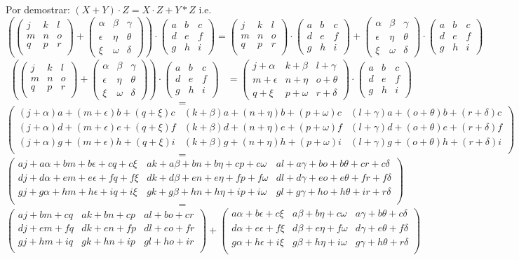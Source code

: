 \documentclass[letterpaper]{article}
\newcommand{\Nmat}{\begin{pmatrix}
		j & k & l\\
		m & n & o\\
		q & p & r\\
\end{pmatrix}}
\newcommand{\Pmat}{\begin{pmatrix}
		\alpha & \beta & \gamma\\
		\epsilon & \eta & \theta\\
		\xi & \omega & \delta
\end{pmatrix}}
\newcommand{\Mmat}{\begin{pmatrix}
		a & b & c\\
		d & e & f\\
		g & h & i
\end{pmatrix}}
\renewcommand{\*}{\cdot}
\theoremstyle{definition}
\begin{document}
Por demostrar: $ (X + Y) \* Z = X\*Z + Y*Z $ i.e. $ \left( \Nmat + \Pmat \right) \* \Mmat = \Nmat \* \Mmat + \Pmat \* \Mmat  $
\begin{align*}
\left( \Nmat + \Pmat \right) \* \Mmat &= \begin{pmatrix}
j + \alpha & k + \beta & l + \gamma\\
m + \epsilon & n + \eta & o + \theta\\
q + \xi & p + \omega & r + \delta
\end{pmatrix}  \* \Mmat
\end{align*}
$$ =$$
$$
\begin{pmatrix}
(j + \alpha)a + (m + \epsilon)b + (q + \xi)c & (k + \beta)a + (n + \eta)b + (p + \omega)c & (l + \gamma)a + (o + \theta)b + (r + \delta)c\\
(j + \alpha)d + (m + \epsilon)e + (q + \xi)f & (k + \beta)d + (n + \eta)e + (p + \omega)f & (l + \gamma)d + (o + \theta)e + (r + \delta)f\\
(j + \alpha)g + (m + \epsilon)h + (q + \xi)i & (k + \beta)g + (n + \eta)h + (p + \omega)i & (l + \gamma)g + (o + \theta)h + (r + \delta)i\\
\end{pmatrix}
$$
$$ =$$
$$ 
\begin{pmatrix}
aj + a\alpha + bm + b\epsilon + cq + c\xi & ak + a\beta + bn + b\eta + cp + c\omega & al + a\gamma + bo + b\theta + cr + c\delta\\
dj + d\alpha + em + e\epsilon + fq + f\xi & dk + d\beta + en + e\eta + fp + f\omega & dl + d\gamma + eo + e\theta + fr + f\delta\\
gj + g\alpha + hm + h\epsilon + iq + i\xi & gk + g\beta + hn + h\eta + ip + i\omega & gl + g\gamma + ho + h\theta + ir + r\delta\\
\end{pmatrix}
$$ 
$$ =$$
$$
\begin{pmatrix}
aj + bm + cq  & ak + bn + cp  & al + bo + cr \\
dj + em + fq  & dk + en + fp  & dl + eo + fr \\
gj + hm + iq  & gk + hn + ip  & gl + ho + ir \\
\end{pmatrix}
+
\begin{pmatrix}
a\alpha + b\epsilon + c\xi & a\beta + b\eta + c\omega & a\gamma + b\theta + c\delta\\
d\alpha + e\epsilon + f\xi & d\beta + e\eta + f\omega & d\gamma + e\theta + f\delta\\
g\alpha + h\epsilon + i\xi & g\beta + h\eta + i\omega & g\gamma + h\theta + r\delta\\
\end{pmatrix}
$$
\end{document}
